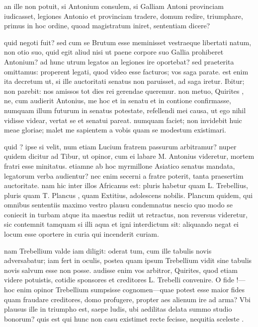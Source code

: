  an ille non potuit, si Antonium consulem, si Galliam Antoni provinciam iudicasset, legiones Antonio et provinciam tradere, domum redire, triumphare, primus in hoc ordine, quoad magistratum iniret, sententiam dicere?

 quid negoti fuit? sed cum se Brutum esse meminisset vestraeque libertati natum, non otio suo, quid egit aliud nisi ut paene corpore suo Gallia prohiberet Antonium? ad hunc utrum legatos an legiones ire oportebat? sed praeterita omittamus: properent legati, quod video esse facturos; vos saga parate. est enim ita decretum ut, si ille auctoritati senatus non paruisset, ad saga iretur. Ibitur; non parebit: nos amissos tot dies rei gerendae queremur. non metuo, Quirites , ne, cum audierit Antonius, me hoc et in senatu et in contione confirmasse, numquam illum futurum in senatus potestate, refellendi mei causa, ut ego nihil vidisse videar, vertat se et senatui pareat. numquam faciet; non invidebit huic meae gloriae; malet me sapientem a vobis quam se modestum existimari.

 quid ? ipse si velit, num etiam Lucium fratrem passurum arbitramur? nuper quidem dicitur ad Tibur, ut opinor, cum ei labare M. Antonius videretur, mortem fratri esse minitatus. etiamne ab hoc myrmillone Asiatico senatus mandata, legatorum verba audientur? nec enim secerni a fratre poterit, tanta praesertim auctoritate. nam hic inter illos Africanus est: pluris habetur quam L. Trebellius, pluris quam T. Plancus , quam Extitius, adolescens nobilis. Plancum quidem, qui omnibus sententiis maximo vestro plausu condemnatus nescio quo modo se coniecit in turbam atque ita maestus rediit ut retractus, non reversus videretur, sic contemnit tamquam si illi aqua et igni interdictum sit: aliquando negat ei locum esse oportere in curia qui incenderit curiam.

 nam Trebellium valde iam diligit: oderat tum, cum ille tabulis novis adversabatur; iam fert in oculis, postea quam ipsum Trebellium vidit sine tabulis novis salvum esse non posse. audisse enim vos arbitror, Quirites, quod etiam videre potuistis, cotidie sponsores et creditores L. Trebelli convenire. O fide !—hoc enim opinor Trebellium sumpsisse cognomen—quae potest esse maior fides quam fraudare creditores, domo profugere, propter aes alienum ire ad arma? Vbi plausus ille in triumpho est, saepe ludis, ubi aedilitas delata summo studio bonorum? quis est qui hunc non casu existimet recte fecisse, nequitia sceleste .

